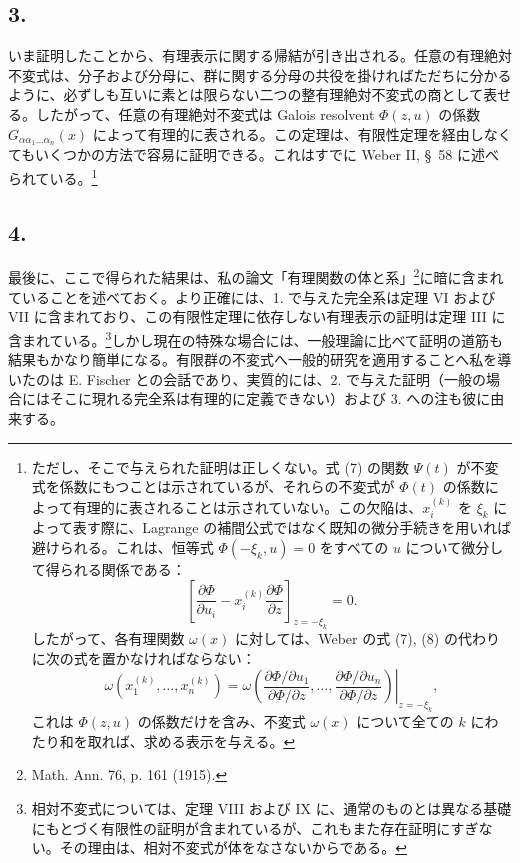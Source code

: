 \documentclass[11pt]{article}
\begin{document}
\subsection*{3.}
いま証明したことから、有理表示に関する帰結が引き出される。任意の有理絶対不変式は、分子および分母に、群に関する分母の共役を掛ければただちに分かるように、必ずしも互いに素とは限らない二つの整有理絶対不変式の商として表せる。したがって、任意の有理絶対不変式は Galois resolvent $\Phi(z,u)$ の係数 $G_{\alpha\alpha_1\ldots\alpha_n}(x)$ によって有理的に表される。この定理は、有限性定理を経由しなくてもいくつかの方法で容易に証明できる。これはすでに Weber II, \S\ 58 に述べられている。\footnote{ただし、そこで与えられた証明は正しくない。式 (7) の関数 $\Psi(t)$ が不変式を係数にもつことは示されているが、それらの不変式が $\Phi(t)$ の係数によって有理的に表されることは示されていない。この欠陥は、$x_i^{(k)}$ を $\xi_k$ によって表す際に、Lagrange の補間公式ではなく既知の微分手続きを用いれば避けられる。これは、恒等式 $\Phi(-\xi_k,u)=0$ をすべての $u$ について微分して得られる関係である：
\[
 \left[\frac{\partial\Phi}{\partial u_i}
      -x_i^{(k)}\frac{\partial\Phi}{\partial z}\right]_{z=-\xi_k}=0.
\]
したがって、各有理関数 $\omega(x)$ に対しては、Weber の式 (7), (8) の代わりに次の式を置かなければならない：
\[
 \omega(x_1^{(k)},\ldots,x_n^{(k)})=
 \left.
 \omega\!\left(
   \frac{\partial\Phi/\partial u_1}{\partial\Phi/\partial z},\ldots,
   \frac{\partial\Phi/\partial u_n}{\partial\Phi/\partial z}
 \right)\right|_{z=-\xi_k},
\]
これは $\Phi(z,u)$ の係数だけを含み、不変式 $\omega(x)$ について全ての $k$ にわたり和を取れば、求める表示を与える。}

\subsection*{4.}
最後に、ここで得られた結果は、私の論文「有理関数の体と系」\footnote{Math. Ann. 76, p. 161 (1915).}に暗に含まれていることを述べておく。より正確には、1. で与えた完全系は定理 VI および VII に含まれており、この有限性定理に依存しない有理表示の証明は定理 III に含まれている。\footnote{相対不変式については、定理 VIII および IX に、通常のものとは異なる基礎にもとづく有限性の証明が含まれているが、これもまた存在証明にすぎない。その理由は、相対不変式が体をなさないからである。}しかし現在の特殊な場合には、一般理論に比べて証明の道筋も結果もかなり簡単になる。有限群の不変式へ一般的研究を適用することへ私を導いたのは E. Fischer との会話であり、実質的には、2. で与えた証明（一般の場合にはそこに現れる完全系は有理的に定義できない）および 3. への注も彼に由来する。
\end{document}
